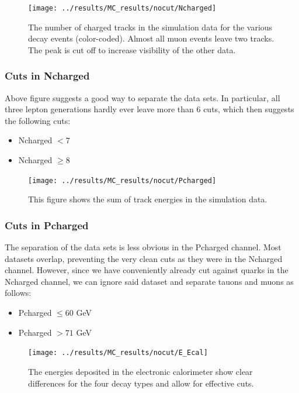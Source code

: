 \newpage
\begin{figure}[H]
\centering
\texttt{[image: ../results/MC\_results/nocut/Ncharged]}
\caption[Ncharged in simulation data]{The number of charged tracks in the simulation data for the various decay events (color-coded). Almost all muon events leave two tracks. The peak is cut off to increase visibility of the other data.}
\label{fig:Ncharged}
\end{figure}

\subsubsection{Cuts in Ncharged}
Above figure suggests a good way to separate the data sets. In particular, all three lepton generations hardly ever leave more than 6 cuts, which then suggests the following cuts:

\begin{itemize}
	\item{ Ncharged $<7$}
	\item{ Ncharged $\ge8$}
\end{itemize}



\newpage
\begin{figure}[H]
\centering
\texttt{[image: ../results/MC\_results/nocut/Pcharged]}
\caption[Pcharged in simulation data]{This figure shows the sum of track energies in the simulation data. }
\label{fig:Pcharged}
\end{figure}

\subsubsection{Cuts in Pcharged}
The separation of the data sets is less obvious in the Pcharged channel. Most datasets overlap, preventing the very clean cuts as they were in the Ncharged channel. However, since we have conveniently already cut against quarks in the Ncharged channel, we can ignore said dataset and separate tauons and muons as follows:
\begin{itemize}
	\item{ Pcharged $\le60$ GeV}
	\item{ Pcharged $>71$ GeV}
\end{itemize}

\newpage
\begin{figure}[H]
\centering
\texttt{[image: ../results/MC\_results/nocut/E\_Ecal]}
\caption[E\_Ecal in simulations]{The energies deposited in the electronic calorimeter show clear differences for the four decay types and allow for effective cuts.}
\label{fig:E_Ecal}
\end{figure}

